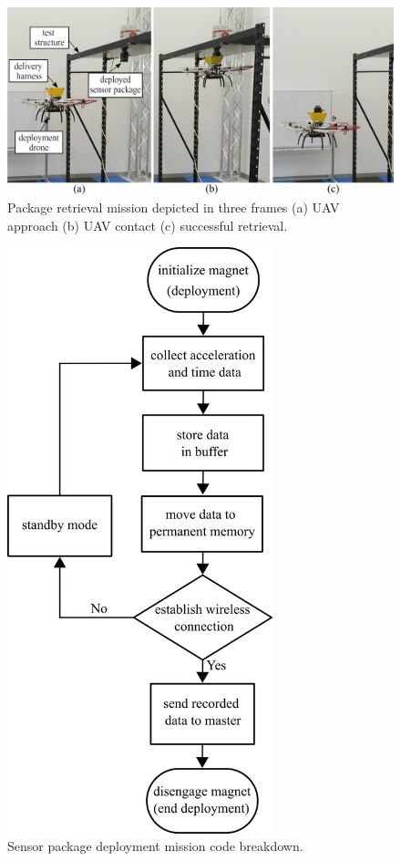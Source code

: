 \documentclass[]{spie}  %
\begin{document}
	\begin{figure} [H]
		\centering
		\includegraphics[width=6in]{figures/UAV deployment.png}
		\caption{Package retrieval mission depicted in three frames (a) UAV approach (b) UAV contact (c) successful retrieval.}
		\label{fig:UAV_deployment} 
	\end{figure}


	\begin{figure} [H]
		\centering
		\includegraphics[height=17cm]{figures/Code FlowChart.png}
		\caption{Sensor package deployment mission code breakdown.}
		\label{fig:Code FlowChart} 
	\end{figure}
	
\end{document}
